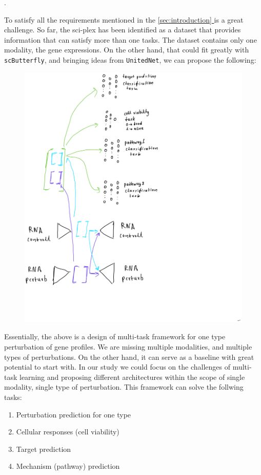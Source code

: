 \documentclass[12pt, a4paper]{article}
\newcommand*{\fullref}[1]{\hyperref[{#1}]{\ref*{#1} \nameref*{#1}}}
\begin{document}
 \cite{szalataTransformersSinglecellOmics2024}.

To satisfy all the requirements mentioned in the \fullref{sec:introduction} is a great challenge. So far, the sci-plex has been identified as a dataset that provides information that can satisfy more than one tasks. The dataset contains only one modality, the gene expressions. On the other hand, that could fit greatly with \verb|scButterfly|, and bringing ideas from \verb|UnitedNet|, we can propose the following:

\begin{figure}[h!]
  \centering
  \includegraphics[width=.6\textwidth]{my_multi_one_mod.PNG}
  \caption{}
  \label{}
\end{figure}

Essentially, the above is a design of multi-task framework for one type perturbation of gene profiles. We are missing multiple modalities, and multiple types of perturbations. On the other hand, it can serve as a baseline with great potential to start with. In our study we could focus on the challenges of multi-task learning and proposing different architectures within the scope of single modality, single type of perturbation. This framework can solve the follwing tasks:

\begin{enumerate}
  \item Perturbation prediction for one type
  \item Cellular responses (cell viability)
  \item Target prediction
  \item Mechanism (pathway) prediction
\end{enumerate}
\end{document}
